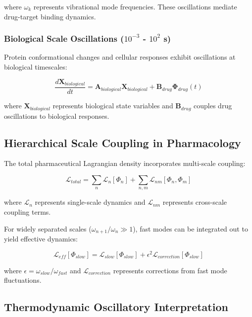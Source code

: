 \documentclass[12pt,a4paper]{article}
\begin{document}
where $\omega_k$ represents vibrational mode frequencies. These oscillations mediate drug-target binding dynamics.

\subsubsection{Biological Scale Oscillations ($10^{-3}$ - $10^2$ s)}

Protein conformational changes and cellular responses exhibit oscillations at biological timescales:

\begin{equation}
\frac{d\mathbf{X}_{biological}}{dt} = \mathbf{A}_{biological} \mathbf{X}_{biological} + \mathbf{B}_{drug} \mathbf{\Phi}_{drug}(t)
\end{equation}

where $\mathbf{X}_{biological}$ represents biological state variables and $\mathbf{B}_{drug}$ couples drug oscillations to biological responses.

\subsection{Hierarchical Scale Coupling in Pharmacology}

The total pharmaceutical Lagrangian density incorporates multi-scale coupling:

\begin{equation}
\mathcal{L}_{total} = \sum_n \mathcal{L}_n[\Phi_n] + \sum_{n,m} \mathcal{L}_{nm}[\Phi_n, \Phi_m]
\end{equation}

where $\mathcal{L}_n$ represents single-scale dynamics and $\mathcal{L}_{nm}$ represents cross-scale coupling terms.

For widely separated scales ($\omega_{n+1}/\omega_n \gg 1$), fast modes can be integrated out to yield effective dynamics:

\begin{equation}
\mathcal{L}_{eff}[\Phi_{slow}] = \mathcal{L}_{slow}[\Phi_{slow}] + \epsilon^2 \mathcal{L}_{correction}[\Phi_{slow}]
\end{equation}

where $\epsilon = \omega_{slow}/\omega_{fast}$ and $\mathcal{L}_{correction}$ represents corrections from fast mode fluctuations.

\subsection{Thermodynamic Oscillatory Interpretation}
\end{document}
